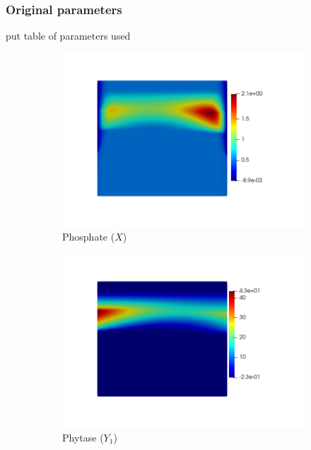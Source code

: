 \documentclass[11pt]{article}
\numberwithin{equation}{section}
\begin{document}
\subsubsection{Original parameters}
put table of parameters used
\begin{figure}[!htb]
\centering
\begin{subfigure}[t]{0.3\textwidth}
    \includegraphics[trim= 100 100 70 100,width=\textwidth]{Figures/X.png}
    \caption{Phosphate ($X$)}
\end{subfigure}
\qquad
\begin{subfigure}[t]{0.3\textwidth}
    \includegraphics[trim= 100 100 70 100,width=\textwidth]{Figures/Y1.png}
    \caption{Phytase ($Y_1$)}
\end{subfigure}
\qquad
\begin{subfigure}[t]{0.3\textwidth}

\end{subfigure}
\end{figure}
\end{document}
